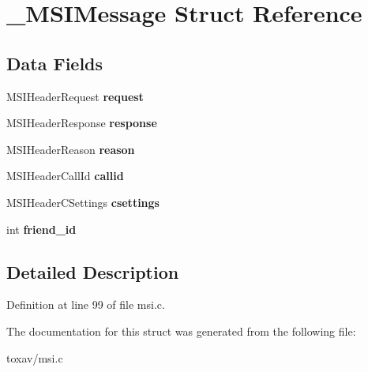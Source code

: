 \hypertarget{struct___m_s_i_message}{\section{\+\_\+\+M\+S\+I\+Message Struct Reference}
\label{struct___m_s_i_message}
}
\subsection*{Data Fields}
\begin{DoxyCompactItemize}
\item 
\hypertarget{struct___m_s_i_message_a43928947ba3f33772bdeee09fd89557a}{M\+S\+I\+Header\+Request {\bfseries request}}\label{struct___m_s_i_message_a43928947ba3f33772bdeee09fd89557a}

\item 
\hypertarget{struct___m_s_i_message_a03f0f34008bf8be095af614ca99ea53f}{M\+S\+I\+Header\+Response {\bfseries response}}\label{struct___m_s_i_message_a03f0f34008bf8be095af614ca99ea53f}

\item 
\hypertarget{struct___m_s_i_message_aec4373dacf43cd56b5e67d2b04b63f5a}{M\+S\+I\+Header\+Reason {\bfseries reason}}\label{struct___m_s_i_message_aec4373dacf43cd56b5e67d2b04b63f5a}

\item 
\hypertarget{struct___m_s_i_message_a0cb3f797b633561175096933c2eb003e}{M\+S\+I\+Header\+Call\+Id {\bfseries callid}}\label{struct___m_s_i_message_a0cb3f797b633561175096933c2eb003e}

\item 
\hypertarget{struct___m_s_i_message_a4b09316f11dc8e9fe3b3357a6d48db56}{M\+S\+I\+Header\+C\+Settings {\bfseries csettings}}\label{struct___m_s_i_message_a4b09316f11dc8e9fe3b3357a6d48db56}

\item 
\hypertarget{struct___m_s_i_message_af43a034662e9bcac38e3bf4c9c150c19}{int {\bfseries friend\+\_\+id}}\label{struct___m_s_i_message_af43a034662e9bcac38e3bf4c9c150c19}

\end{DoxyCompactItemize}


\subsection{Detailed Description}


Definition at line 99 of file msi.\+c.



The documentation for this struct was generated from the following file\+:\begin{DoxyCompactItemize}
\item 
toxav/msi.\+c\end{DoxyCompactItemize}
